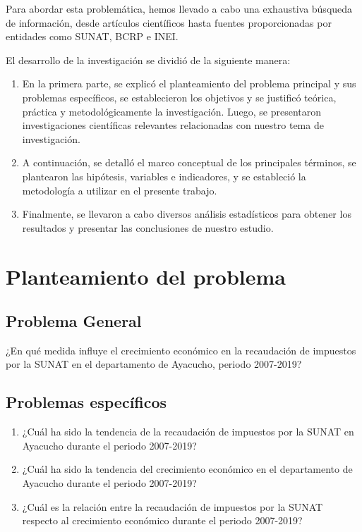 \documentclass[
  letterpaper,
]{article}
\providecommand{\tightlist}{%
  \setlength{\itemsep}{0pt}\setlength{\parskip}{0pt}}\usepackage{longtable,booktabs,array}
\begin{document}
Para abordar esta problemática, hemos llevado a cabo una exhaustiva
búsqueda de información, desde artículos científicos hasta fuentes
proporcionadas por entidades como SUNAT, BCRP e INEI.

El desarrollo de la investigación se dividió de la siguiente manera:

\begin{enumerate}
\def\labelenumi{\arabic{enumi}.}
\item
  En la primera parte, se explicó el planteamiento del problema
  principal y sus problemas específicos, se establecieron los objetivos
  y se justificó teórica, práctica y metodológicamente la investigación.
  Luego, se presentaron investigaciones científicas relevantes
  relacionadas con nuestro tema de investigación.
\item
  A continuación, se detalló el marco conceptual de los principales
  términos, se plantearon las hipótesis, variables e indicadores, y se
  estableció la metodología a utilizar en el presente trabajo.
\item
  Finalmente, se llevaron a cabo diversos análisis estadísticos para
  obtener los resultados y presentar las conclusiones de nuestro
  estudio.
\end{enumerate}

\hypertarget{planteamiento-del-problema}{%
\section{Planteamiento del problema}\label{planteamiento-del-problema}}

\hypertarget{problema-general}{%
\subsection{Problema General}\label{problema-general}}

¿En qué medida influye el crecimiento económico en la recaudación de
impuestos por la SUNAT en el departamento de Ayacucho, periodo
2007-2019?

\hypertarget{problemas-especuxedficos}{%
\subsection{Problemas específicos}\label{problemas-especuxedficos}}

\begin{enumerate}
\def\labelenumi{\arabic{enumi}.}
\tightlist
\item
  ¿Cuál ha sido la tendencia de la recaudación de impuestos por la SUNAT
  en Ayacucho durante el periodo 2007-2019?
\item
  ¿Cuál ha sido la tendencia del crecimiento económico en el
  departamento de Ayacucho durante el periodo 2007-2019?
\item
  ¿Cuál es la relación entre la recaudación de impuestos por la SUNAT
  respecto al crecimiento económico durante el periodo 2007-2019?
\end{enumerate}
\end{document}
